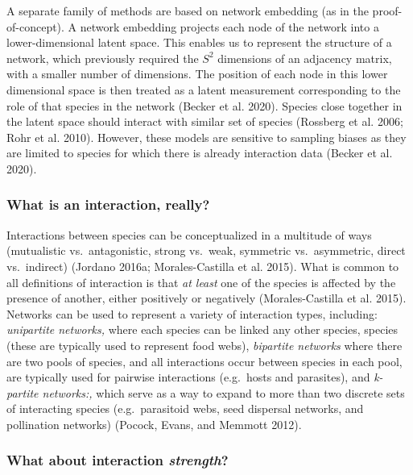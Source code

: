 \documentclass[11pt]{article}
\begin{document}
A separate family of methods are based on network embedding (as in the
proof-of-concept). A network embedding projects each node of the network
into a lower-dimensional latent space. This enables us to represent the
structure of a network, which previously required the \(S^2\) dimensions
of an adjacency matrix, with a smaller number of dimensions. The
position of each node in this lower dimensional space is then treated as
a latent measurement corresponding to the role of that species in the
network (Becker et al. 2020). Species close together in the latent space
should interact with similar set of species (Rossberg et al. 2006; Rohr
et al. 2010). However, these models are sensitive to sampling biases as
they are limited to species for which there is already interaction data
(Becker et al. 2020).

\hypertarget{what-is-an-interaction-really}{%
\subsubsection{What is an interaction,
really?}\label{what-is-an-interaction-really}}

Interactions between species can be conceptualized in a multitude of
ways (mutualistic vs.~antagonistic, strong vs.~weak, symmetric
vs.~asymmetric, direct vs.~indirect) (Jordano 2016a; Morales-Castilla et
al. 2015). What is common to all definitions of interaction is that
\emph{at least} one of the species is affected by the presence of
another, either positively or negatively (Morales-Castilla et al. 2015).
Networks can be used to represent a variety of interaction types,
including: \emph{unipartite networks,} where each species can be linked
any other species, species (these are typically used to represent food
webs), \emph{bipartite networks} where there are two pools of species,
and all interactions occur between species in each pool, are typically
used for pairwise interactions (e.g.~hosts and parasites), and
\emph{k-partite networks:,} which serve as a way to expand to more than
two discrete sets of interacting species (e.g.~parasitoid webs, seed
dispersal networks, and pollination networks) (Pocock, Evans, and
Memmott 2012).

\hypertarget{what-about-interaction-strength}{%
\subsubsection{\texorpdfstring{What about interaction
\emph{strength}?}{What about interaction strength?}}\label{what-about-interaction-strength}}
\end{document}
